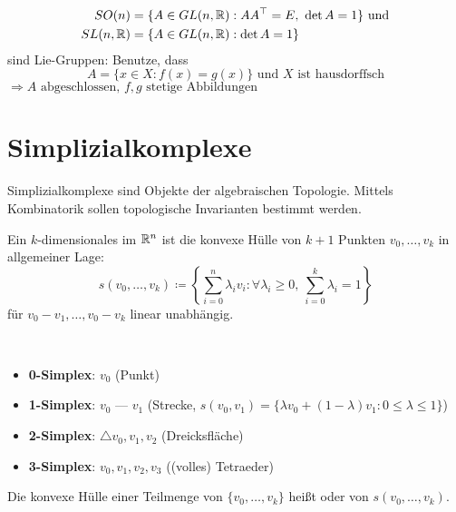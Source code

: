 \begin{example}
  \
  \begin{align*}
    SO(n) &= \{ A \in GL(n, \mathbb{R}) : AA^\top = E, \ \det A = 1 \} \text{ und} \\
    SL(n, \mathbb{R}) &= \{ A \in GL(n, \mathbb{R}) : \det A = 1 \}
  \end{align*}
  sind Lie-Gruppen: Benutze, dass
  \begin{equation*}
    A = \{ x \in X : f(x) = g(x) \} \text{ und } X \text{ ist hausdorffsch}
  \end{equation*}
  $ \Rightarrow A \text{ abgeschlossen, } f, g \text{ stetige Abbildungen} $
\end{example}

\section{Simplizialkomplexe}

Simplizialkomplexe sind Objekte der algebraischen Topologie. Mittels Kombinatorik sollen topologische Invarianten bestimmt werden.

\begin{definition}[Simplex]
  Ein $ k $-dimensionales \label{def:simplex} im $ \mathbb{R}^n $ ist die konvexe Hülle von $ k+1 $ Punkten $ v_0, \dots, v_k $ in allgemeiner Lage:
  \begin{equation*}
    s(v_0, \dots, v_k) \coloneqq \left\{ \sum_{i=0}^n \lambda_i v_i : \forall \lambda_i \geq 0, \ \sum_{i = 0}^k \lambda_i = 1 \right\}
  \end{equation*}
  für $ v_0-v_1, \dots, v_0-v_k $ linear unabhängig.
\end{definition}

\begin{example}
  \
  \begin{itemize}
    \item \textbf{0-Simplex}: $ v_0 $ (Punkt) 
    \item \textbf{1-Simplex}: $ v_0 $ --- $ v_1 $ (Strecke, $ s(v_0, v_1) = \{ \lambda v_0 + (1-\lambda)v_1 : 0 \leq \lambda \leq 1 \} $)
    \item \textbf{2-Simplex}: $ \triangle v_0, v_1, v_2 $ (Dreicksfläche)
    \item \textbf{3-Simplex}: $ v_0, v_1, v_2, v_3 $ ((volles) Tetraeder)
  \end{itemize}
\end{example}

\begin{definition}[Teilsimplex, Seite]
  Die konvexe Hülle einer Teilmenge von $ \{ v_0, \dots, v_k \} $ heißt \label{def:seite} oder  von $ s(v_0, \dots, v_k) $.
\end{definition}

